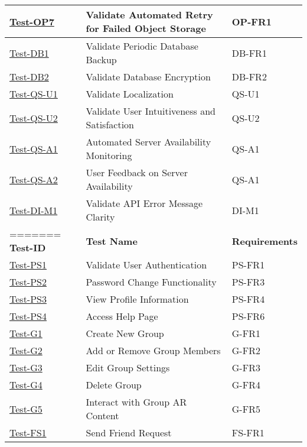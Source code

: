 \documentclass[12pt, titlepage]{article}
\begin{document}
\begin{enumerate}
\begin{table}[h!]
\begin{tabular}{|l|l|l|}
        \hline
        \hyperref[itm:Test-OP7]{Test-OP7} & Validate Automated Retry for Failed Object Storage & OP-FR1 \\
        \hline
        \hyperref[itm:Test-DB1]{Test-DB1} & Validate Periodic Database Backup & DB-FR1 \\
        \hline
        \hyperref[itm:Test-DB2]{Test-DB2} & Validate Database Encryption & DB-FR2 \\
        \hline
        \hyperref[itm:Test-QS-U1]{Test-QS-U1} & Validate Localization & QS-U1 \\
        \hline
        \hyperref[itm:Test-QS-U2]{Test-QS-U2} & Validate User Intuitiveness and Satisfaction & QS-U2 \\
        \hline
        \hyperref[itm:Test-QS-A1]{Test-QS-A1} & Automated Server Availability Monitoring & QS-A1 \\
        \hline
        \hyperref[itm:Test-QS-A2]{Test-QS-A2} & User Feedback on Server Availability & QS-A1 \\
        \hline
        \hyperref[itm:Test-DI-M1]{Test-DI-M1} & Validate API Error Message Clarity & DI-M1 \\
=======
        \textbf{Test-ID} & \textbf{Test Name} & \textbf{Requirements} \\
        \hline
        \hyperref[itm:Test-PS1]{Test-PS1} & Validate User Authentication & PS-FR1 \\
        \hline
        \hyperref[itm:Test-PS2]{Test-PS2} & Password Change Functionality & PS-FR3 \\
        \hline
        \hyperref[itm:Test-PS3]{Test-PS3} & View Profile Information & PS-FR4 \\
        \hline
        \hyperref[itm:Test-PS4]{Test-PS4} & Access Help Page & PS-FR6 \\
        \hline
        \hyperref[itm:Test-G1]{Test-G1} & Create New Group & G-FR1 \\
        \hline
        \hyperref[itm:Test-G2]{Test-G2} & Add or Remove Group Members & G-FR2 \\
        \hline
        \hyperref[itm:Test-G3]{Test-G3} & Edit Group Settings & G-FR3 \\
        \hline
        \hyperref[itm:Test-G4]{Test-G4} & Delete Group & G-FR4 \\
        \hline
        \hyperref[itm:Test-G5]{Test-G5} & Interact with Group AR Content & G-FR5 \\
        \hline
        \hyperref[itm:Test-FS1]{Test-FS1} & Send Friend Request & FS-FR1 \\

\end{tabular}
\end{table}
\end{enumerate}
\end{document}
